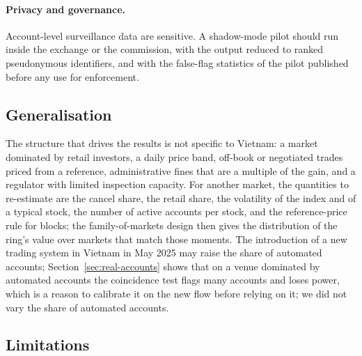 \paragraph{Privacy and governance.} Account-level surveillance data are sensitive. A shadow-mode pilot should run inside the exchange or the commission, with the output reduced to ranked pseudonymous identifiers, and with the false-flag statistics of the pilot published before any use for enforcement.

\subsection{Generalisation}

The structure that drives the results is not specific to Vietnam: a market dominated by retail investors, a daily price band, off-book or negotiated trades priced from a reference, administrative fines that are a multiple of the gain, and a regulator with limited inspection capacity. For another market, the quantities to re-estimate are the cancel share, the retail share, the volatility of the index and of a typical stock, the number of active accounts per stock, and the reference-price rule for blocks; the family-of-markets design then gives the distribution of the ring's value over markets that match those moments. The introduction of a new trading system in Vietnam in May 2025 may raise the share of automated accounts; Section~\ref{sec:real-accounts} shows that on a venue dominated by automated accounts the coincidence test flags many accounts and loses power, which is a reason to calibrate it on the new flow before relying on it; we did not vary the share of automated accounts.

\subsection{Limitations}


